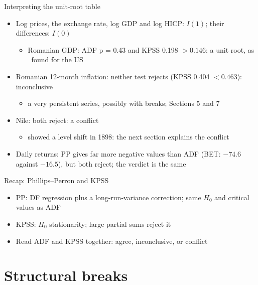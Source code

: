 \begin{frame}{Interpreting the unit-root table}
\itemsize{\small}
\begin{itemize}
    \item Log prices, the exchange rate, log GDP and log HICP: $I(1)$; their differences: $I(0)$
    \begin{itemize}
        \item Romanian GDP: ADF p = 0.43 and KPSS 0.198 $> 0.146$: a unit root, as \ found for the US
    \end{itemize}
    \item Romanian 12-month inflation: neither test rejects (KPSS 0.404 $< 0.463$): inconclusive
    \begin{itemize}
        \item a very persistent series, possibly with breaks; Sections 5 and 7
    \end{itemize}
    \item Nile: both reject: a conflict
    \begin{itemize}
        \item {} showed a level shift in 1898: the next section explains the conflict
    \end{itemize}
    \item Daily returns: PP gives far more negative values than ADF (BET: $\ensuremath{-}74.6$ against $\ensuremath{-}16.5$), but both reject; the verdict is the same
\end{itemize}
\end{frame}

\begin{frame}{Recap: Phillips--Perron and KPSS}
\itemsize{\small}
\begin{itemize}
    \item PP: DF regression plus a long-run-variance correction; same $H_0$ and critical values as ADF
    \item KPSS: $H_0$ stationarity; large partial sums reject it
    \item Read ADF and KPSS together: agree, inconclusive, or conflict
\end{itemize}
\end{frame}


\section{Structural breaks}

